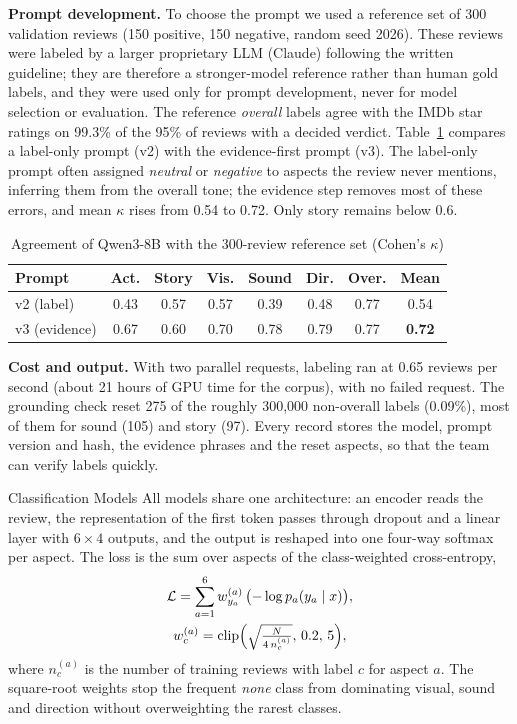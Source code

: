 \documentclass[conference]{IEEEtran}
\makeatletter
\def\subsection{\@startsection{subsection}{2}{\z@}{1.6ex plus .8ex minus .4ex}{.7ex plus .2ex}%
  {\normalfont\fontsize{11}{13}\selectfont\bfseries\itshape\raggedright}}
\makeatother
\begin{document}
\textbf{Prompt development.} To choose the prompt we used a reference set of 300 validation reviews (150 positive, 150 negative, random seed 2026). These reviews were labeled by a larger proprietary LLM (Claude) following the written guideline; they are therefore a stronger-model reference rather than human gold labels, and they were used only for prompt development, never for model selection or evaluation. The reference \emph{overall} labels agree with the IMDb star ratings on 99.3\% of the 95\% of reviews with a decided verdict. Table~\ref{tab:prompt} compares a label-only prompt (v2) with the evidence-first prompt (v3). The label-only prompt often assigned \emph{neutral} or \emph{negative} to aspects the review never mentions, inferring them from the overall tone; the evidence step removes most of these errors, and mean $\kappa$ rises from 0.54 to 0.72. Only story remains below 0.6.

\begin{table}[t]
\caption{Agreement of Qwen3-8B with the 300-review reference set (Cohen's $\kappa$)}
\label{tab:prompt}
\centering
\small
\setlength{\tabcolsep}{2.5pt}
\begin{tabular*}{\columnwidth}{@{\extracolsep{\fill}}lccccccc@{}}
\toprule
Prompt & Act. & Story & Vis. & Sound & Dir. & Over. & Mean \\
\midrule
v2 (label) & 0.43 & 0.57 & 0.57 & 0.39 & 0.48 & 0.77 & 0.54 \\
v3 (evidence) & 0.67 & 0.60 & 0.70 & 0.78 & 0.79 & 0.77 & \textbf{0.72} \\
\bottomrule
\end{tabular*}
\end{table}

\textbf{Cost and output.} With two parallel requests, labeling ran at 0.65 reviews per second (about 21 hours of GPU time for the corpus), with no failed request. The grounding check reset 275 of the roughly 300{,}000 non-overall labels (0.09\%), most of them for sound (105) and story (97). Every record stores the model, prompt version and hash, the evidence phrases and the reset aspects, so that the team can verify labels quickly.

\subsection{Classification Models}
All models share one architecture: an encoder reads the review, the representation of the first token passes through dropout and a linear layer with $6\times4$ outputs, and the output is reshaped into one four-way softmax per aspect. The loss is the sum over aspects of the class-weighted cross-entropy,
\begin{gather}
\mathcal{L} = \sum_{a=1}^{6} w^{(a)}_{y_a}\,\bigl(-\log p_a(y_a\mid x)\bigr),\\
w^{(a)}_c = \mathrm{clip}\Bigl(\sqrt{\tfrac{N}{4\,n^{(a)}_c}},\,0.2,\,5\Bigr),
\end{gather}
where $n^{(a)}_c$ is the number of training reviews with label $c$ for aspect $a$. The square-root weights stop the frequent \emph{none} class from dominating visual, sound and direction without overweighting the rarest classes.
\end{document}
